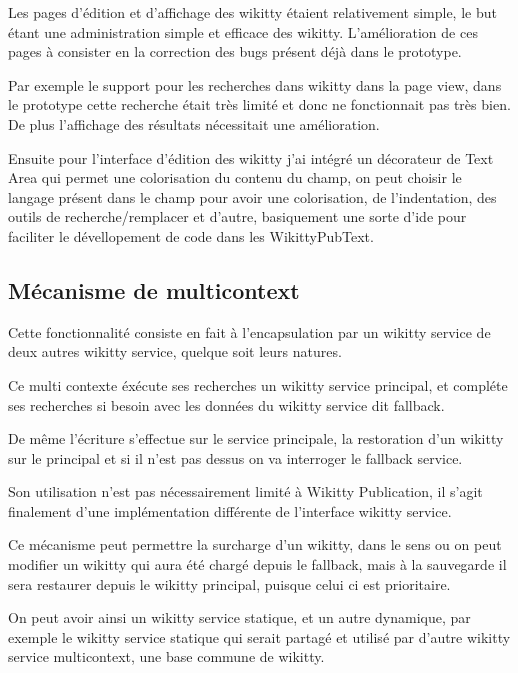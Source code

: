 Les pages d'édition et d'affichage des wikitty étaient relativement simple, le
but étant une administration simple et efficace des wikitty. L'amélioration de
ces pages à consister en la correction des bugs présent déjà dans le prototype.

Par exemple le support pour les recherches dans wikitty dans la page view,
dans le prototype cette recherche était très limité et donc ne fonctionnait pas
très bien. De plus l'affichage des résultats nécessitait une amélioration.

Ensuite pour l'interface d'édition des wikitty j'ai intégré un décorateur de
Text Area qui permet une colorisation du contenu du champ, on peut choisir le
langage présent dans le champ pour avoir une colorisation, de l'indentation, des
outils de recherche/remplacer et d'autre, basiquement une sorte d'ide pour
faciliter le dévellopement de code dans les WikittyPubText.



\subsection{Mécanisme de multicontext}

Cette fonctionnalité consiste en fait à l'encapsulation par un wikitty service
de deux autres wikitty service, quelque soit leurs natures.

Ce multi contexte éxécute ses recherches un wikitty service principal, et
compléte ses recherches si besoin avec les données du wikitty service dit
fallback.

De même l'écriture s'effectue sur le service principale, la restoration d'un
wikitty sur le principal et si il n'est pas dessus on va interroger le fallback
service.


Son utilisation n'est pas nécessairement limité à Wikitty Publication, il s'agit
finalement d'une implémentation différente de l'interface wikitty service. 

Ce mécanisme peut permettre la surcharge d'un wikitty, dans le sens ou on peut
modifier un wikitty qui aura été chargé depuis le fallback, mais à la sauvegarde
il sera restaurer depuis le wikitty principal, puisque celui ci est prioritaire.

On peut avoir ainsi un wikitty service statique, et un autre dynamique, par
exemple le wikitty service statique qui serait partagé et utilisé par d'autre
wikitty service multicontext, une base commune de wikitty.



